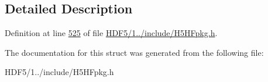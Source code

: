 \subsection{Detailed Description}


Definition at line \hyperlink{_h_d_f5_21_810_81_2include_2_h5_h_fpkg_8h_source_l00525}{525} of file \hyperlink{_h_d_f5_21_810_81_2include_2_h5_h_fpkg_8h_source}{H\+D\+F5/1../include/\+H5\+H\+Fpkg.\+h}.



The documentation for this struct was generated from the following file\+:\begin{DoxyCompactItemize}
\item 
H\+D\+F5/1../include/\+H5\+H\+Fpkg.\+h\end{DoxyCompactItemize}
